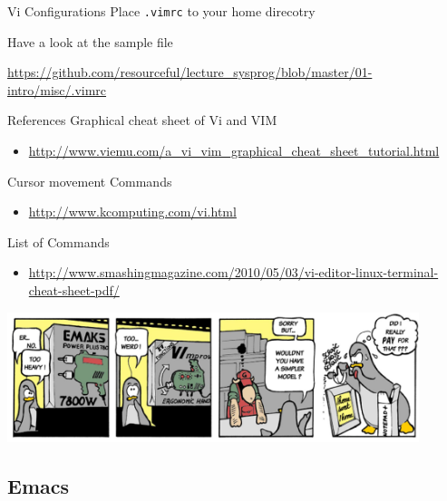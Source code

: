\documentclass[newPxFont,sthlmFooter,nooffset]{beamer}
\begin{document}
\begin{frame}[t]{Vi Configurations}
Place \texttt{.vimrc} to your home direcotry

\bigskip
Have a look at the sample file

\url{https://github.com/resourceful/lecture_sysprog/blob/master/01-intro/misc/.vimrc}
\end{frame}

\begin{frame}[t]{References}
Graphical cheat sheet of Vi and VIM
\begin{itemize}
\item \url{http://www.viemu.com/a_vi_vim_graphical_cheat_sheet_tutorial.html}
\end{itemize}

Cursor movement Commands
\begin{itemize}
\item \url{http://www.kcomputing.com/vi.html}
\end{itemize}

List of Commands
\begin{itemize}
\item \url{http://www.smashingmagazine.com/2010/05/03/vi-editor-linux-terminal-cheat-sheet-pdf/}
\end{itemize}

\bigskip\centering
\includegraphics[width=0.9\textwidth]{./figure/vi_tools.png}
\end{frame}




\subsection{Emacs}
\end{document}
